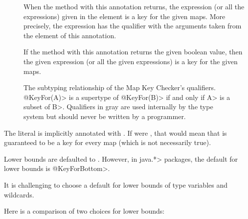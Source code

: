\begin{description}
\item[]
  When the method with this annotation returns, the expression (or all the
  expressions) given in the  element is a key for the given
  maps. More precisely, the expression has the  qualifier
  with the  arguments taken from the  element
  of this annotation.
\item[]
  If the method with this annotation returns the given boolean value,
  then the given expression (or all the given expressions)
  is a key for the given maps.
\end{description}

\begin{figure}
\caption{The subtyping relationship of the Map Key Checker's qualifiers.
\<@KeyFor(A)> is a supertype of \<@KeyFor(B)> if and only if \<A> is a subset of
\<B>.  Qualifiers in gray are used internally by the type system but should
never be written by a programmer.}
\label{fig-map-key-keyfor-hierarchy}
\end{figure}


The  literal is implicitly annotated with .
If  were , that would mean that
 is guaranteed to be a key for every map (which is not
necessarily true).


Lower bounds are defaulted to .
However, in \<java.*> packages, the default for lower bounds is
\<@KeyForBottom>.

It is challenging to choose a default for lower bounds of type variables
and wildcards.

Here is a comparison of two choices for lower bounds:

\medskip

